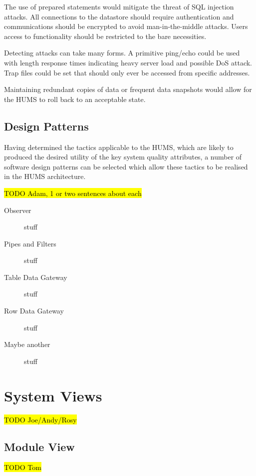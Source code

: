 \documentclass[10pt,a4paper]{article}
\begin{document}
\begin{description}
\begin{description}[noitemsep]
	\end{description}
\item[Security] \hfill
	\begin{description}[noitemsep]
	\item[Resisting Attacks] The use of prepared statements would mitigate the threat of SQL injection attacks. All connections to the datastore should require authentication and communications should be encrypted to avoid man-in-the-middle attacks. Users access to functionality should be restricted to the bare necessities. 
	\item[Detecting Attacks] Detecting attacks can take many forms. A primitive ping/echo could be used with length response times indicating heavy server load and possible DoS attack. Trap files could be set that should only ever be accessed from specific addresses.
	\item[Recovering From Attacks] Maintaining redundant copies of data or frequent data snapshots would allow for the HUMS to roll back to an acceptable state.
	\end{description}
\end{description}

\subsection{Design Patterns}
Having determined the tactics applicable to the HUMS, which are likely to produced the desired utility of the key system quality attributes, a number of software design patterns can be selected which allow these tactics to be realised in the HUMS architecture.

\hl{TODO Adam, 1 or two sentences about each}
\begin{description}
\item[Observer] stuff
\item[Pipes and Filters] stuff
\item[Table Data Gateway] stuff
\item[Row Data Gateway] stuff
\item[Maybe another] stuff
\end{description}

\section{System Views} 
\hl{TODO Joe/Andy/Rosy}

\subsection{Module View}
\label{sec:views}
\hl{TODO Tom}
\end{document}
